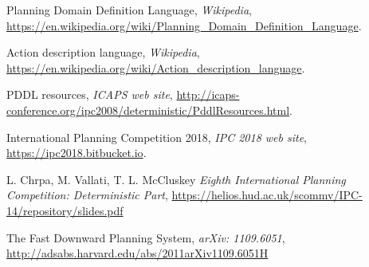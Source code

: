 \documentclass[11pt]{article}   	%
\begin{document}
\begin{thebibliography}{1}

 Planning Domain Definition Language, {\em Wikipedia}, \url{https://en.wikipedia.org/wiki/Planning_Domain_Definition_Language}.

 Action description language, {\em Wikipedia}, \url{https://en.wikipedia.org/wiki/Action_description_language}.


 PDDL resources, {\em ICAPS web site}, \url{http://icaps-conference.org/ipc2008/deterministic/PddlResources.html}.

 International Planning Competition 2018, {\em IPC 2018 web site}, \url{https://ipc2018.bitbucket.io}.

 L. Chrpa, M. Vallati, T. L. McCluskey {\em Eighth International Planning Competition: Deterministic Part}, \url{https://helios.hud.ac.uk/scommv/IPC-14/repository/slides.pdf}

 The Fast Downward Planning System, {\em arXiv: 1109.6051}, \url{http://adsabs.harvard.edu/abs/2011arXiv1109.6051H}



\end{thebibliography}
\end{document}
